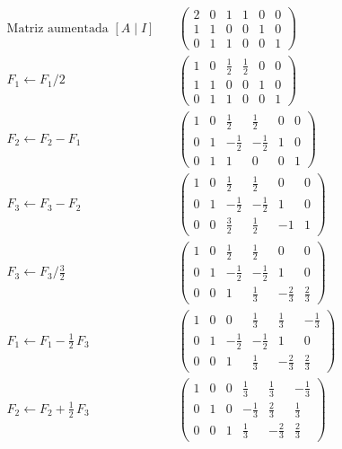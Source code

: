 \begin{align*}
\text{Matriz aumentada $[A\mid I]$}\quad& \left(\begin{array}{ccc|ccc} 2 & 0 & 1 & 1 & 0 & 0 \\ 1 & 1 & 0 & 0 & 1 & 0 \\ 0 & 1 & 1 & 0 & 0 & 1 \end{array}\right) \\[4pt]
\text{$F_1\leftarrow F_1/2$}\quad& \left(\begin{array}{ccc|ccc} 1 & 0 & \tfrac{1}{2} & \tfrac{1}{2} & 0 & 0 \\ 1 & 1 & 0 & 0 & 1 & 0 \\ 0 & 1 & 1 & 0 & 0 & 1 \end{array}\right) \\[4pt]
\text{$F_2\leftarrow F_2-F_1$}\quad& \left(\begin{array}{ccc|ccc} 1 & 0 & \tfrac{1}{2} & \tfrac{1}{2} & 0 & 0 \\ 0 & 1 & -\tfrac{1}{2} & -\tfrac{1}{2} & 1 & 0 \\ 0 & 1 & 1 & 0 & 0 & 1 \end{array}\right) \\[4pt]
\text{$F_3\leftarrow F_3-F_2$}\quad& \left(\begin{array}{ccc|ccc} 1 & 0 & \tfrac{1}{2} & \tfrac{1}{2} & 0 & 0 \\ 0 & 1 & -\tfrac{1}{2} & -\tfrac{1}{2} & 1 & 0 \\ 0 & 0 & \tfrac{3}{2} & \tfrac{1}{2} & -1 & 1 \end{array}\right) \\[4pt]
\text{$F_3\leftarrow F_3/\tfrac{3}{2}$}\quad& \left(\begin{array}{ccc|ccc} 1 & 0 & \tfrac{1}{2} & \tfrac{1}{2} & 0 & 0 \\ 0 & 1 & -\tfrac{1}{2} & -\tfrac{1}{2} & 1 & 0 \\ 0 & 0 & 1 & \tfrac{1}{3} & -\tfrac{2}{3} & \tfrac{2}{3} \end{array}\right) \\[4pt]
\text{$F_1\leftarrow F_1-\tfrac{1}{2}\,F_3$}\quad& \left(\begin{array}{ccc|ccc} 1 & 0 & 0 & \tfrac{1}{3} & \tfrac{1}{3} & -\tfrac{1}{3} \\ 0 & 1 & -\tfrac{1}{2} & -\tfrac{1}{2} & 1 & 0 \\ 0 & 0 & 1 & \tfrac{1}{3} & -\tfrac{2}{3} & \tfrac{2}{3} \end{array}\right) \\[4pt]
\text{$F_2\leftarrow F_2+\tfrac{1}{2}\,F_3$}\quad& \left(\begin{array}{ccc|ccc} 1 & 0 & 0 & \tfrac{1}{3} & \tfrac{1}{3} & -\tfrac{1}{3} \\ 0 & 1 & 0 & -\tfrac{1}{3} & \tfrac{2}{3} & \tfrac{1}{3} \\ 0 & 0 & 1 & \tfrac{1}{3} & -\tfrac{2}{3} & \tfrac{2}{3} \end{array}\right)
\end{align*}
